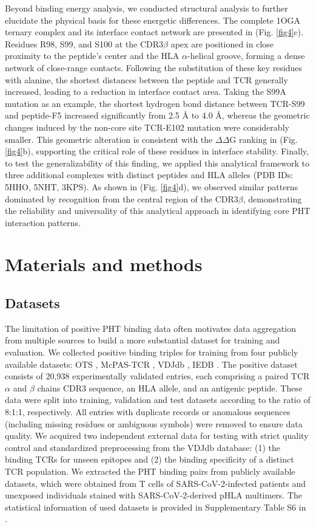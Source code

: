 \documentclass[10pt,letterpaper]{article}
\begin{document}
Beyond binding energy analysis, we conducted structural analysis to further elucidate the physical basis for these energetic differences. The complete 1OGA ternary complex and its interface contact network are presented in (Fig. \ref{fig4}c). Residues R98, S99, and S100 at the CDR3$\beta$ apex are positioned in close proximity to the peptide's center and the HLA $\alpha$-helical groove, forming a dense network of close-range contacts. Following the substitution of these key residues with alanine, the shortest distances between the peptide and TCR generally increased, leading to a reduction in interface contact area. Taking the S99A mutation as an example, the shortest hydrogen bond distance between TCR-S99 and peptide-F5 increased significantly from 2.5 Å to 4.0 Å, whereas the geometric changes induced by the non-core site TCR-E102 mutation were considerably smaller. This geometric alteration is consistent with the $\Delta$$\Delta$G ranking in (Fig. \ref{fig4}b), supporting the critical role of these residues in interface stability. Finally, to test the generalizability of this finding, we applied this analytical framework to three additional complexes with distinct peptides and HLA alleles (PDB IDs: 5HHO, 5NHT, 3KPS). As shown in (Fig. \ref{fig4}d), we observed similar patterns dominated by recognition from the central region of the CDR3$\beta$, demonstrating the reliability and universality of this analytical approach in identifying core PHT interaction patterns.


\section*{Materials and methods}

\subsection*{Datasets}
The limitation of positive PHT binding data often motivates data aggregation from multiple sources to build a more substantial dataset for training and evaluation. We collected positive binding triples for training from four publicly available datasets: OTS \cite{ref43}, McPAS-TCR \cite{ref44}, VDJdb \cite{ref31}, IEDB \cite{ref32}. The positive dataset consists of 20,938 experimentally validated entries, each comprising a paired TCR $\alpha$ and $\beta$ chains CDR3 sequence, an HLA allele, and an antigenic peptide. These data were split into training, validation and test datasets according to the ratio of 8:1:1, respectively. All entries with duplicate records or anomalous sequences (including missing residues or ambiguous symbols) were removed to ensure data quality. We acquired two independent external data for testing with strict quality control and standardized preprocessing from the VDJdb database: (1) the binding TCRs for unseen epitopes and (2) the binding specificity of a distinct TCR population. We extracted the PHT binding pairs from publicly available datasets, which were obtained from T cells of SARS-CoV-2-infected patients and unexposed individuals stained with SARS-CoV-2-derived pHLA multimers. The statistical information of used datasets is provided in Supplementary Table S6 in .
\end{document}
